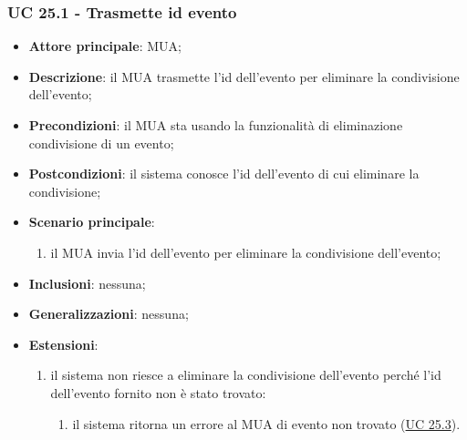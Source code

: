     \subsubsection{UC 25.1 - Trasmette id evento} \label{sec:UC25.1}
    \begin{itemize}
        \item \textbf{Attore principale}: MUA;
        \item \textbf{Descrizione}: il MUA trasmette l'id dell'evento per eliminare la condivisione dell'evento;
        \item \textbf{Precondizioni}: il MUA sta usando la funzionalità di eliminazione condivisione di un evento;
        \item \textbf{Postcondizioni}: il sistema conosce l'id dell'evento di cui eliminare la condivisione;
        \item \textbf{Scenario principale}:
            \begin{enumerate}
                \item il MUA invia l'id dell'evento per eliminare la condivisione dell'evento;
            \end{enumerate}
        \item \textbf{Inclusioni}: nessuna;
        \item \textbf{Generalizzazioni}: nessuna;
        \item \textbf{Estensioni}:
            \begin{enumerate}[label=\alph*.]
                \item il sistema non riesce a eliminare la condivisione dell'evento perché l'id dell'evento fornito non è stato trovato:
                \begin{enumerate}[label=\arabic*.]
                    \item il sistema ritorna un errore al MUA di evento non trovato (\hyperref[sec:UC25.3]{UC 25.3}).
                \end{enumerate}
            \end{enumerate}
    \end{itemize}


